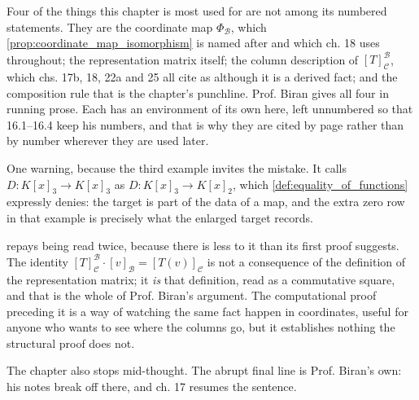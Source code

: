 \begin{ainote}
Four of the things this chapter is most used for are not among its numbered
statements. They are the coordinate map $\Phi_{\mathcal{B}}$, which
\cref{prop:coordinate_map_isomorphism} is named after and which ch. 18 uses
throughout; the representation matrix itself; the column description of
$[T]_{\mathcal{C}}^{\mathcal{B}}$, which chs. 17b, 18, 22a and 25 all cite as
 although it is a derived fact;
and the composition rule that is the chapter's punchline. Prof. Biran gives all
four in running prose. Each has an environment of its own here, left unnumbered
so that 16.1--16.4 keep his numbers, and that is why they are cited by page
rather than by number wherever they are used later.

One warning, because the third example invites the mistake. It calls
$D \colon K[x]_3 \to K[x]_3$  as $D \colon K[x]_3 \to K[x]_2$,
which \cref{def:equality_of_functions} expressly denies: the target is part of
the data of a map, and the extra zero row in that example is precisely what the
enlarged target records.

 repays being read twice, because there is less to
it than its first proof suggests. The identity
$[T]_{\mathcal{C}}^{\mathcal{B}} \cdot [v]_{\mathcal{B}} = [T(v)]_{\mathcal{C}}$
is not a consequence of the definition of the representation matrix; it
\emph{is} that definition, read as a commutative square, and that is the whole
of Prof. Biran's argument. The computational proof preceding it is a way of
watching the same fact happen in coordinates, useful for anyone who wants to see
where the columns go, but it establishes nothing the structural proof does not.

The chapter also stops mid-thought. The abrupt final line is Prof. Biran's own:
his notes break off there, and ch. 17 resumes the sentence.
\end{ainote}
